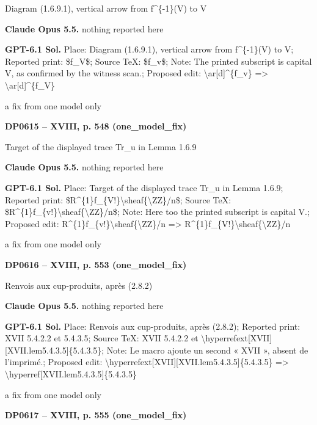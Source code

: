 Diagram (1.6.9.1), vertical arrow from f\textasciicircum{}\{-1\}(V) to V\par
\textbf{Claude Opus 5.5.} nothing reported here\par
\textbf{GPT-6.1 Sol.} Place: Diagram (1.6.9.1), vertical arrow from f\textasciicircum{}\{-1\}(V) to V; Reported print: \$f\_V\$; Source TeX: \$f\_v\$; Note: The printed subscript is capital V, as confirmed by the witness scan.; Proposed edit: \textbackslash{}ar[d]\textasciicircum{}\{f\_v\} =\allowbreak > \textbackslash{}ar[d]\textasciicircum{}\{f\_V\}\par
a fix from one model only\par
\par\noindent\hypertarget{DP0615}{}\textbf{DP0615 -- XVIII, p. 548 (one\_model\_fix)}\par
Target of the displayed trace Tr\_u in Lemma 1.6.9\par
\textbf{Claude Opus 5.5.} nothing reported here\par
\textbf{GPT-6.1 Sol.} Place: Target of the displayed trace Tr\_u in Lemma 1.6.9; Reported print: \$R\textasciicircum{}\{1\}f\_\{V!\}\textbackslash{}sheaf\{\textbackslash{}ZZ\}/n\$; Source TeX: \$R\textasciicircum{}\{1\}f\_\{v!\}\textbackslash{}sheaf\{\textbackslash{}ZZ\}/n\$; Note: Here too the printed subscript is capital V.; Proposed edit: R\textasciicircum{}\{1\}f\_\{v!\}\textbackslash{}sheaf\{\textbackslash{}ZZ\}/n =\allowbreak > R\textasciicircum{}\{1\}f\_\{V!\}\textbackslash{}sheaf\{\textbackslash{}ZZ\}/n\par
a fix from one model only\par
\par\noindent\hypertarget{DP0616}{}\textbf{DP0616 -- XVIII, p. 553 (one\_model\_fix)}\par
Renvois aux cup-produits, après (2.8.2)\par
\textbf{Claude Opus 5.5.} nothing reported here\par
\textbf{GPT-6.1 Sol.} Place: Renvois aux cup-produits, après (2.8.2); Reported print: XVII 5.4.2.2 et 5.4.3.5; Source TeX: XVII 5.4.2.2 et \textbackslash{}hyperrefext[XVII][XVII.lem5.4.3.5]\{5.4.3.5\}; Note: Le macro ajoute un second « XVII », absent de l'imprimé.; Proposed edit: \textbackslash{}hyperrefext[XVII][XVII.lem5.4.3.5]\{5.4.3.5\} =\allowbreak > \textbackslash{}hyperref[XVII.lem5.4.3.5]\{5.4.3.5\}\par
a fix from one model only\par
\par\noindent\hypertarget{DP0617}{}\textbf{DP0617 -- XVIII, p. 555 (one\_model\_fix)}\par
